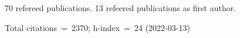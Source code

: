 70 refereed publications. 13 refeered publications as first author.

Total citations~=~2370; h-index~=~24 (2022-03-13)